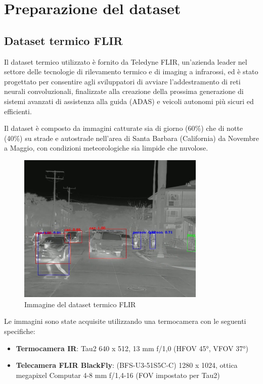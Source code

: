 \section{Preparazione del dataset}

\subsection{Dataset termico FLIR}
Il dataset termico utilizzato è fornito da Teledyne FLIR\cite{39}, un'azienda leader nel settore delle tecnologie di rilevamento termico e di imaging a infrarossi, ed è stato progettato per consentire agli sviluppatori di avviare l'addestramento di reti neurali convoluzionali, finalizzate alla creazione della prossima generazione di sistemi avanzati di assistenza alla guida (ADAS) e veicoli autonomi più sicuri ed efficienti.

Il dataset è composto da immagini catturate sia di giorno (60\%) che di notte (40\%) su strade e autostrade nell’area di Santa Barbara (California) da Novembre a Maggio, con condizioni meteorologiche sia limpide che nuvolose.

\vspace{0.5cm}

\begin{figure}[ht]
    \centering
    \includegraphics[width=0.8\textwidth]{files/capitoli/4-sperimentazione-risultati/assets/flir-example.png}
    \caption{\label{fig:flir-example}Immagine del dataset termico FLIR\cite{39}}
\end{figure}

\newpage

Le immagini sono state acquisite utilizzando una termocamera con le seguenti specifiche\cite{39}:
\begin{itemize}
    \item \textbf{Termocamera IR}: Tau2 640 x 512, 13 mm f/1,0 (HFOV 45°, VFOV 37°)
    \item \textbf{Telecamera FLIR BlackFly}: (BFS-U3-51S5C-C) 1280 x 1024, ottica megapixel Computar 4-8 mm f/1,4-16 (FOV impostato per Tau2)
\end{itemize}

